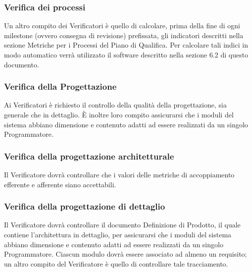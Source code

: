 \subsubsection{Verifica dei processi}
Un altro compito dei Verificatori è quello di calcolare, prima della fine di ogni milestone (ovvero consegna di revisione) prefissata, gli indicatori descritti nella sezione Metriche per i Processi del Piano di Qualifica. Per calcolare tali indici in modo automatico verrà utilizzato il software descritto nella sezione 6.2 di questo documento.

\subsubsection{Verifica della Progettazione}
\label{}
Ai Verificatori è richiesto il controllo della qualità della progettazione, sia generale che in dettaglio.
È inoltre loro compito assicurarsi che i moduli del sistema abbiano dimensione e contenuto adatti ad essere realizzati da un singolo Programmatore.

\subsubsection{Verifica della progettazione architetturale}
Il Verificatore dovrà controllare che i valori delle metriche di accoppiamento efferente e afferente siano accettabili.

\subsubsection{Verifica della progettazione di dettaglio}
Il Verificatore dovrà controllare il documento Definizione di Prodotto, il quale contiene l'architettura in dettaglio, per assicurarsi che i moduli del sistema abbiano dimensione e contenuto adatti ad essere realizzati da un singolo Programmatore.
Ciascun modulo dovrà essere associato ad almeno un requisito; un altro compito del Verificatore è quello di controllare tale tracciamento.

